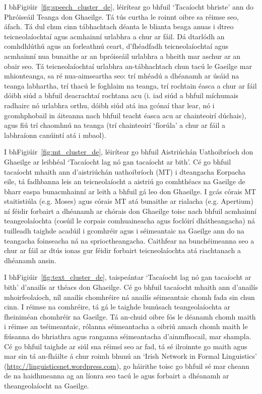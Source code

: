 \begin{multicols}{2}
I bhFigiúir~\ref{fig:speech_cluster_de}, léirítear go bhfuil `Tacaíocht bhriste’ ann do Phróiseáil Teanga don Ghaeilge. Tá tús curtha le roinnt oibre sa réimse seo, áfach. Tá dul chun cinn tábhachtach déanta le blianta beaga anuas i dtreo teicneolaíochtaí agus acmhainní urlabhra a chur ar fáil. Dá dtarlódh an comhdhlúthú agus an forleathnú ceart, d’fhéadfadh teicneolaíochtaí agus acmhainní nua bunaithe ar an bpróiseáil urlabhra a bheith mar aschur ar an obair seo. Tá teicneolaíochtaí urlabhra an-tábhachtach chun tacú le Gaeilge mar mhionteanga, sa ré nua-aimseartha seo: trí mhéadú a dhéanamh ar úsáid na teanga labhartha, trí thacú le foghlaim na teanga, trí rochtain éasca a chur ar fáil dóibh siúd a bhfuil deacrachtaí rochtana acu (i. iad siúd a bhfuil míchumais radhairc nó urlabhra orthu, dóibh siúd atá ina gcónaí thar lear, nó i gcomhphobail in áiteanna nach bhfuil teacht éasca acu ar chainteoirí dúchais), agus fiú trí chaomhnú na teanga (trí chainteoirí `fíorúla’ a chur ar fáil a labhraíonn canúintí atá i mbaol).

I bhFigiúir~\ref{fig:mt_cluster_de}, léirítear go bhfuil Aistriúchán Uathoibríoch don Ghaeilge ar leibhéal ‘Tacaíocht lag nó gan tacaíocht ar bith’. Cé go bhfuil tacaíocht mhaith ann d’aistriúchán uathoibríoch (MT) i dteangacha Eorpacha eile, tá fadhbanna leis an teicneolaíocht a aistriú go comhthéacs na Gaeilge de bharr easpa bunacmhainní ar leith a bhfuil gá leo don Ghaeilge. I gcás córais MT staitistiúla (e.g. Moses) agus córais MT atá bunaithe ar rialacha (e.g. Apertium) ní féidir forbairt a dhéanamh ar chórais don Ghaeilge toisc nach bhfuil acmhainní teangeolaíochta (cosúil le corpais comhuaineacha agus foclóirí dhátheangacha) ná tuilleadh taighde acadúil i gcomhréir agus i séimeantaic na Gaeilge ann do na teangacha foinseacha ná na sprioctheangacha. Caithfear na bunchéimeanna seo a chur ar fáil ar dtús ionas gur féidir forbairt teicneolaíochta atá riachtanach a dhéanamh ansin.

I bhFigiúir~\ref{fig:text_cluster_de}, taispeántar ‘Tacaíocht lag nó gan tacaíocht ar bith’ d’anailís ar théacs don Ghaeilge. Cé go bhfuil tacaíocht mhaith ann d’anailís mhoirfeolaíoch, níl anailís chomhréire ná anailís séimeantaic chomh fada sin chun cinn. I réimse na comhréire, tá gá le taighde bunúsach teangeolaíochta ar fheiniméan chomhréir na Gaeilge. Tá an-chuid oibre fós le déanamh chomh maith i réimse an tséimeantaic, rólanna séimeantacha a oibriú amach chomh maith le fiúsanna do bhriathra agus ranganna séimeantacha d’ainmfhocail, mar shampla. Cé go bhfuil taighde ar siúl sna réimsí seo ar fad, tá sé ilroinnte go maith agus mar sin tá an-fháilte á chur roimh bhunú an ‘Irish Network in Formal Linguistics' (\url{http://linguisticsnet.wordpress.com}), go háirithe toisc go bhfuil sé mar cheann de na haidhmeanna ag an líonra seo tacú le agus forbairt a dhéanamh ar theangeolaíocht na Gaeilge.


\end{multicols}
